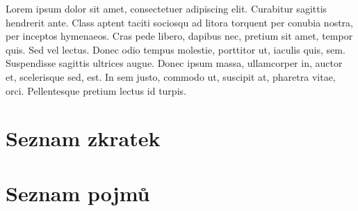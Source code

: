 \documentclass[czech,bachelor,unicode]{ctufit-thesis}
\begin{document}
\begin{declarationpage}

Lorem ipsum dolor sit amet, consectetuer adipiscing elit. Curabitur sagittis hendrerit ante. Class aptent taciti sociosqu ad litora torquent per conubia nostra, per inceptos hymenaeos. Cras pede libero, dapibus nec, pretium sit amet, tempor quis. Sed vel lectus. Donec odio tempus molestie, porttitor ut, iaculis quis, sem. Suspendisse sagittis ultrices augue. Donec ipsum massa, ullamcorper in, auctor et, scelerisque sed, est. In sem justo, commodo ut, suscipit at, pharetra vitae, orci. Pellentesque pretium lectus id turpis.
\end{declarationpage}
\newcommand{\term}[1]{{\fontfamily{qcr}\selectfont #1}}
\printabstractpage %
\chapter{Seznam zkratek}

\chapter{Seznam pojmů}

\mainmatter\mainmatterinit %

\appendix\appendixinit %
\backmatter %
\printbibliography %
\end{document}
